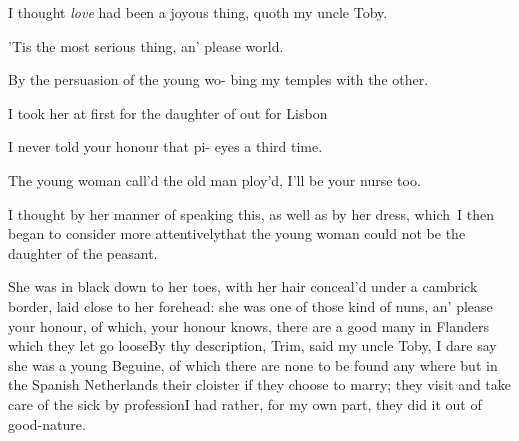 \documentclass[twoside]{article}
\begin{document}
I thought \textit{love} had been a joyous thing,\break
quoth my uncle Toby.

’Tis the most serious thing, an’ please\break
{}
world.

By the persuasion of the young wo-\break
{} 
bing my temples with the other.

I took her at first for the daughter of\break
{}
out for Lisbon\tsh

\tsh I never told your honour that pi-\break
{}
eyes a third time.

The young woman call’d the old man\break
{}
ploy’d, I’ll be your nurse too.

I thought by her manner of speaking\break
this, as well as by her dress, which~I then
began to consider more
attentively\break\tsk that the young woman
could not be the daughter of the peasant.

She was in black down to her toes, with her
hair conceal’d under a cambrick border,
laid close to her forehead: she
was one of those kind of nuns, an’ please
your honour, of which, your honour knows,
there are a good many in Flanders which
they let go loose\tsh By thy description,
Trim, said my uncle Toby, I dare say she
was a young Beguine, of which there are
none to be found any where but in the
Spanish Netherlands\tsk\break {}  their
cloister if they choose to marry; they
visit and take care of the sick by
profession\tsh I had rather, for my own
part, they did it out of good-nature.
\end{document}
